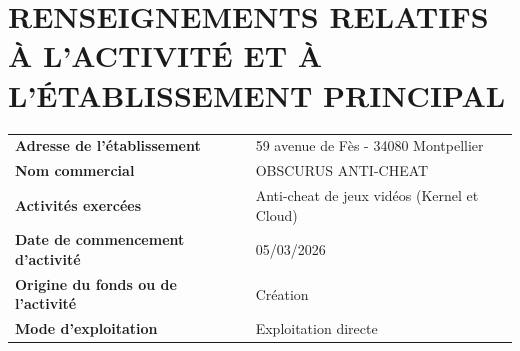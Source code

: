 \documentclass[10pt,a4paper]{article}
\begin{document}
\section*{RENSEIGNEMENTS RELATIFS À L'ACTIVITÉ ET À L'ÉTABLISSEMENT PRINCIPAL}
\begin{table}[h!]
\renewcommand{\arraystretch}{1.5}
\begin{tabularx}{\textwidth}{l X}
\textbf{Adresse de l’établissement} & 59 avenue de Fès - 34080 Montpellier \\
\textbf{Nom commercial} & OBSCURUS ANTI-CHEAT \\
\textbf{Activités exercées} & Anti-cheat de jeux vidéos (Kernel et Cloud) \\
\textbf{Date de commencement d’activité} & 05/03/2026 \\
\textbf{Origine du fonds ou de l’activité} & Création \\
\textbf{Mode d’exploitation} & Exploitation directe \\
\end{tabularx}
\end{table}
\end{document}

